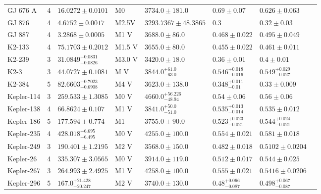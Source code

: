 \begin{tabular}{lrllllll}
GJ 676 A & 4 & $16.0272 \pm 0.0101$ & M0 & $3734.0 \pm 181.0$ & $0.69 \pm 0.07$ & $0.626 \pm 0.063$ & \cite{STASSUN_ET_AL__2017} \\
GJ 876 & 4 & $4.6752 \pm 0.0017$ & M2.5V & $3293.7367 \pm 48.3865$ & 0.3 & $0.32 \pm 0.03$ & \cite{ROSENTHAL_ET_AL__2021} \\
GJ 887 & 4 & $3.2868 \pm 0.0005$ & M1 V & $3688.0 \pm 86.0$ & $0.468 \pm 0.022$ & $0.495 \pm 0.049$ & \cite{HARTOGH_ET_AL_2026} \\
K2-133 & 4 & $75.1703 \pm 0.2012$ & M1.5 V & $3655.0 \pm 80.0$ & $0.455 \pm 0.022$ & $0.461 \pm 0.011$ & \cite{WELLS_ET_AL__2019} \\
K2-239 & 3 & $31.0849^{+0.0831}_{-0.0826}$ & M3.0 V & $3420.0 \pm 18.0$ & $0.36 \pm 0.01$ & $0.4 \pm 0.01$ & \cite{D_IACUTE_EZ_ALONSO_ET_AL__2018} \\
K2-3 & 3 & $44.0727 \pm 0.1081$ & M V & $3844.0^{+61.0}_{-63.0}$ & $0.546^{+0.018}_{-0.016}$ & $0.549^{+0.029}_{-0.027}$ & \cite{DIAMOND_LOWE_ET_AL__2022} \\
K2-384 & 5 & $82.6603^{+0.7023}_{-0.6908}$ & M4 V & $3623.0 \pm 138.0$ & $0.348^{+0.011}_{-0.01}$ & $0.33 \pm 0.009$ & \cite{CHRISTIANSEN_ET_AL_2022} \\
Kepler-114 & 3 & $259.533 \pm 1.3085$ & M0 V & $4660.0^{+56.226}_{-48.94}$ & $0.54 \pm 0.06$ & $0.56 \pm 0.06$ & \cite{MORTON_ET_AL__2016} \\
Kepler-138 & 4 & $66.8624 \pm 0.107$ & M1 V & $3841.0^{+50.0}_{-51.0}$ & $0.535^{+0.013}_{-0.014}$ & $0.535 \pm 0.012$ & \cite{PIAULET_ET_AL_2023} \\
Kepler-186 & 5 & $177.594 \pm 0.774$ & M1 & $3755.0 \pm 90.0$ & $0.523^{+0.023}_{-0.021}$ & $0.544^{+0.024}_{-0.021}$ & \cite{TORRES_ET_AL__2015} \\
Kepler-235 & 4 & $428.018^{+6.695}_{-6.495}$ & M0 V & $4255.0 \pm 100.0$ & $0.554 \pm 0.021$ & $0.581 \pm 0.018$ & \cite{ROWE_ET_AL__2014} \\
Kepler-249 & 3 & $190.401 \pm 1.2195$ & M2 V & $3568.0 \pm 150.0$ & $0.482 \pm 0.018$ & $0.5102 \pm 0.0204$ & \cite{ROWE_ET_AL__2014} \\
Kepler-26 & 4 & $335.307 \pm 3.0565$ & M0 V & $3914.0 \pm 119.0$ & $0.512 \pm 0.017$ & $0.544 \pm 0.025$ & \cite{JONTOF_HUTTER_ET_AL__2016} \\
Kepler-267 & 3 & $264.993 \pm 2.4925$ & M1 V & $4258.0 \pm 100.0$ & $0.555 \pm 0.021$ & $0.5416 \pm 0.0206$ & \cite{ROWE_ET_AL__2014} \\
Kepler-296 & 5 & $167.0^{+21.428}_{-20.247}$ & M2 V & $3740.0 \pm 130.0$ & $0.48^{+0.066}_{-0.087}$ & $0.498^{+0.067}_{-0.087}$ & \cite{BARCLAY_ET_AL__2015} \\

\end{tabular}
